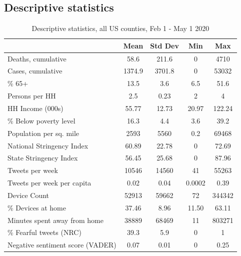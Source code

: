 \documentclass[12pt,a4]{article}
\begin{document}
\subsection{Descriptive statistics}\label{descrip}
\begin{singlespace}
    \begin{table}[!htb]
    \centering  
  \caption{Descriptive statistics, all US counties, Feb 1 - May 1 2020}
    \begin{tabular}{lcccc}
      \toprule
       & Mean & Std Dev & Min & Max\\
      \midrule
      
      Deaths, cumulative & 58.6 & 211.6 & 0 & 4710\\
      Cases, cumulative & 1374.9 & 3701.8 & 0 & 53032\\
      \midrule
      \% 65+ & 13.5 & 3.6 & 6.5 & 51.6\\
    Persons per HH & 2.5 & 0.23 & 2 & 4\\
    HH Income (000s) & 55.77 & 12.73 & 20.97 & 122.24\\
    \% Below poverty level & 16.3 & 4.4 & 3.6 & 39.2\\
    Population per sq. mile & 2593 & 5560 & 0.2 & 69468\\
    \midrule
    National Stringency Index & 60.89 & 22.78 & 0 & 72.69\\
    State Stringency Index & 56.45 & 25.68 & 0 & 87.96\\
    \midrule
    Tweets per week & 10546 & 14560 & 41 & 55263\\
    Tweets per week per capita & 0.02 & 0.04 & 0.0002 & 0.39\\
    \midrule
    Device Count & 52913 & 59662 & 72 & 344342\\
    \% Devices at home & 37.46 & 8.96 & 11.50 & 63.11\\
    Minutes spent away from home & 38889 & 68469 & 11 & 803271\\
    \midrule
    \% Fearful tweets (NRC) & 39.3 & 5.9 & 0 & 1\\
  
    Negative sentiment score (VADER) & 0.07 & 0.01 & 0 & 0.25\\
  
    \bottomrule
    \end{tabular}
  \end{table}
\end{singlespace}
\end{document}

